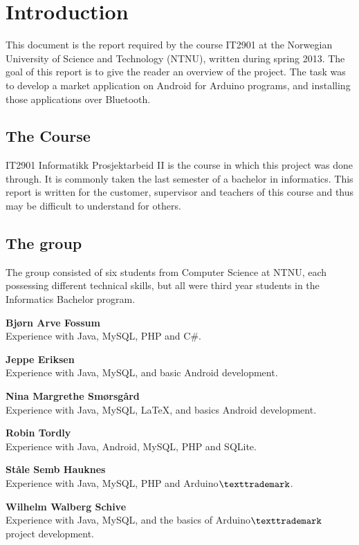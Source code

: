 \chapter{Introduction}

This document is the report required by the course IT2901 at the Norwegian University of Science and Technology (NTNU), written during spring 2013. The goal of this report is to give the reader an overview of the project.
The task was to develop a market application on Android for Arduino programs, and installing those applications over Bluetooth.

\section{The Course}
IT2901 Informatikk Prosjektarbeid II is the course in which this project was done through. It is commonly taken the last semester of a bachelor in informatics. This report is written for the customer, supervisor and teachers of this course and thus may be difficult to understand for others.

\section{The group}
The group consisted of six students from Computer Science at NTNU, each possessing different technical skills, but all were third year students in the Informatics Bachelor program.

\begin{description}
	\item{\textbf{Bjørn Arve Fossum}}\hfill \\
		Experience with Java, MySQL, PHP and C\#.
	\item{\textbf{Jeppe Eriksen}}\hfill \\
		Experience with Java, MySQL, and basic Android development.
	\item{\textbf{Nina Margrethe Smørsgård}}\hfill \\
		Experience with Java, MySQL, \LaTeX, and basics Android development.
	\item{\textbf{Robin Tordly}}\hfill \\
		Experience with Java, Android, MySQL, PHP and SQLite.
	\item{\textbf{Ståle Semb Hauknes}}\hfill \\
		Experience with Java, MySQL, PHP and Arduino$\texttrademark$.
	\item{\textbf{Wilhelm Walberg Schive}}\hfill \\
		Experience with Java, MySQL, and the basics of Arduino$\texttrademark$ project development.

\end{description}

